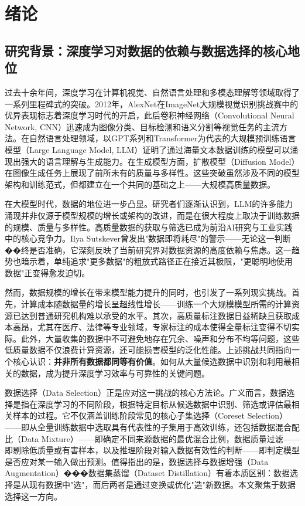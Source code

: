 \chapter{绪论}

\section{研究背景：深度学习对数据的依赖与数据选择的核心地位}

过去十余年间，深度学习在计算机视觉、自然语言处理和多模态理解等领域取得了一系列里程碑式的突破。2012年，AlexNet在ImageNet大规模视觉识别挑战赛\cite{deng2009imagenet}中的优异表现标志着深度学习时代的开启，此后卷积神经网络（Convolutional Neural Network, CNN）迅速成为图像分类、目标检测和语义分割等视觉任务的主流方法\cite{he2016deep, simonyan2015very}。在自然语言处理领域，以GPT系列\cite{radford2019language}和Transformer\cite{vaswani2017attention}为代表的大规模预训练语言模型（Large Language Model, LLM）证明了通过海量文本数据训练的模型可以涌现出强大的语言理解与生成能力。在生成模型方面，扩散模型（Diffusion Model）在图像生成任务上展现了前所未有的质量与多样性。这些突破虽然涉及不同的模型架构和训练范式，但都建立在一个共同的基础之上——大规模高质量数据。

在大模型时代，数据的地位进一步凸显。研究者们逐渐认识到，LLM的许多能力涌现并非仅源于模型规模的增长或架构的改进，而是在很大程度上取决于训练数据的规模、质量与多样性\cite{hoffmann2022training, kaplan2020scaling}。高质量数据的获取与筛选已成为前沿AI研究与工业实践中的核心竞争力\cite{albalak2024survey}。Ilya Sutskever曾发出"数据即将耗尽"的警示——无论这一判断��终是否准确，它深刻反映了当前研究界对数据资源的高度依赖与焦虑。这一趋势也暗示着，单纯追求"更多数据"的粗放式路径正在接近其极限，"更聪明地使用数据"正变得愈发迫切。

然而，数据规模的增长在带来模型能力提升的同时，也引发了一系列现实挑战。首先，计算成本随数据量的增长呈超线性增长\cite{hoffmann2022training}——训练一个大规模模型所需的计算资源已达到普通研究机构难以承受的水平。其次，高质量标注数据日益稀缺且获取成本高昂，尤其在医疗、法律等专业领域，专家标注的成本使得全量标注变得不切实际。此外，大量收集的数据中不可避免地存在冗余、噪声和分布不均等问题，这些低质量数据不仅浪费计算资源，还可能损害模型的泛化性能\cite{sorscher2022beyond}。上述挑战共同指向一个核心认识：\textbf{并非所有数据都同等有价值}。如何从大量候选数据中识别和利用最相关的数据，成为提升深度学习效率与可靠性的关键问题。

数据选择（Data Selection）正是应对这一挑战的核心方法论\cite{albalak2024survey}。广义而言，数据选择是指在深度学习的不同阶段，根据特定目标从候选数据中识别、筛选或评估最相关样本的过程。它不仅涵盖训练阶段常见的核心子集选择（Coreset Selection）\cite{mirzasoleiman2020coresets, killamsetty2021grad}——即从全量训练数据中选取具有代表性的子集用于高效训练，还包括数据混合配比（Data Mixture）——即确定不同来源数据的最优混合比例，数据质量过滤——即剔除低质量或有害样本\cite{chen2023alpagasus, zhou2023lima}，以及推理阶段对输入数据有效性的判断——即判定模型是否应对某一输入做出预测。值得指出的是，数据选择与数据增强（Data Augmentation）���数据集蒸馏（Dataset Distillation）\cite{wang2018dataset, cazenavette2022dataset}有着本质区别：数据选择是从现有数据中"选"，而后两者是通过变换或优化"造"新数据。本文聚焦于数据选择这一方向。

